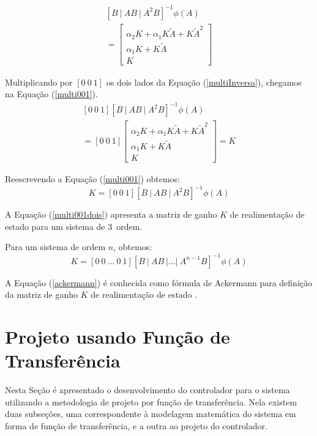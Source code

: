 \documentclass[journal,brazil,english]{IEEEtran}
\begin{document}
\begin{equation}\label{multiInversa}
\begin{matrix}
\left[B~|~AB~|~A^2B\right]^{-1}\phi(A)\\ =
\left[\begin{matrix}
 \alpha _2K + \alpha _1K\tilde{A} + K\tilde{A}^2 \\ 
 \alpha _1K + K\tilde{A} \\
 K
\end{matrix}\right]
\end{matrix}
\end{equation}

Multiplicando por $\left[0~0~1\right]$ os dois lados da Equação (\ref{multiInversa}), chegamos na Equação (\ref{multi001}).
\begin{equation}\label{multi001}
\begin{matrix}
\left[0~0~1\right]\left[B~|~AB~|~A^2B\right]^{-1}\phi(A)\\ =
\left[0~0~1\right]
\left[\begin{matrix}
 \alpha _2K + \alpha _1K\tilde{A} + K\tilde{A}^2 \\ 
 \alpha _1K + K\tilde{A} \\
 K
\end{matrix}\right] = K
\end{matrix}
\end{equation}

Reescrevendo a Equação (\ref{multi001}) obtemos:
\begin{equation}\label{multi001dois}
K= \left[0~0~1\right]\left[B~|~AB~|~A^2B\right]^{-1}\phi(A)
\end{equation}

A Equação (\ref{multi001dois}) apresenta a matriz de ganho $K$ de realimentação de estado para um sistema de 3\textordfeminine~ordem.

Para um sistema de ordem $n$, obtemos:
\begin{equation}\label{ackermann}
K= \left[0~0~\ldots~0~1\right]\left[B~|~AB~|\ldots|~A^{n-1}B\right]^{-1}\phi(A)
\end{equation}

A Equação (\ref{ackermann}) é conhecida como fórmula de Ackermann para definição da matriz de ganho $K$ de realimentação de estado \cite{ogata}.

\section{Projeto usando Função de Transferência}\label{funcaotransferencia}
Nesta Seção é apresentado o desenvolvimento do controlador para o sistema utilizando a metodologia de projeto por função de transferência. Nela existem duas subseções, uma correspondente à modelagem matemática do sistema em forma de função de transferência, e a outra ao projeto do controlador.
\end{document}
